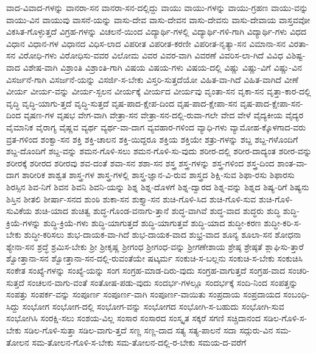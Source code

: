 {ವಾದ-ವಿವಾದ-ಗಳನ್ನು
ವಾನರಾ-ಸನ
ವಾನರಾ-ಸನ-ದಲ್ಲಿದ್ದು
ವಾಯು
ವಾಯು-ಗಳನ್ನು
ವಾಯು-ಗ್ರಹಣ
ವಾಯು-ವನ್ನು
ವಾಯು-ವಿನ
ವಾಯುವು
ವಾಸನೆ-ಯನ್ನು
ವಾಸು-ದೇವ
ವಾಸು-ದೇವನ
ವಾಸು-ದೇವನು
ವಾಸು-ದೇವಾಯ
ವಾಸ್ತವವೋ
ವಿಕಸಿತ-ಗೊಳ್ಳುತ್ತದೆ
ವಿಗ್ರಹ-ಗಳನ್ನು
ವಿಚಲನೆ-ಯಿಂದ
ವಿದ್ಯಾರ್ಥಿ-ಗಳಲ್ಲಿ
ವಿದ್ಯಾರ್ಥಿ-ಗಳಿ-ಗಾಗಿ
ವಿದ್ಯಾರ್ಥಿ-ಗಳು
ವಿಧದ
ವಿಧಾನ
ವಿಧಾನ-ಗಳ
ವಿಧಾನದ
ವಿಧಿಸ-ಲಾದ
ವಿಪರೀತ
ವಿಪರೀತ-ಕರಣೀ
ವಿಪರೀತ-ನೃತ್ಯಾ-ಸನ
ವಿಮಾನಾ-ಸನ
ವಿರತಾ-ಸನ
ವಿರೋಧಿ-ಗಳು
ವಿರೋಧಿಸು-ವವರ
ವಿಲೋಮ
ವಿವರ
ವಿವರ-ವಾಗಿ
ವಿವರಣೆ
ವಿವರಿಸ-ಲಾ-ಗಿದೆ
ವಿವಿಧ
ವಿಶಿಷ್ಟ-ವಾದ
ವಿಶೇಷ-ವಾಗಿ
ವಿಶ್ರಾಂತಿ
ವಿಶ್ರಾಂತಿ-ಗಾಗಿ
ವಿಷಯ
ವಿಷಯ-ಗಳು
ವಿಷಯ-ದಲ್ಲಿ
ವಿಷ್ಣು
ವಿಷ್ಣು-ವಿಗೆ
ವಿಷ್ಣು-ವಿನ
ವಿಸರ್ಜನೆ-ಗಾಗಿ
ವಿಸರ್ಜನೆ-ಯನ್ನು
ವಿಸರ್ಜಿ-ಸ-ಬೇಕು
ವಿಸ್ತರಿ-ಸುತ್ತದೆಯೋ
ವಿಹಿತ-ವಾ-ಗಿದೆ
ವಿಹಿತ-ವಾಗಿದೆ
ವೀಣೆ
ವೀರ್ಯ
ವೀರ್ಯ-ವನ್ನು
ವೀರ್ಯ-ಸ್ಖಲನ
ವೀರ್ಯಕ್ಕೆ
ವೀರ್ಯದ
ವೀರ್ಯವು
ವೃಂತಾ-ಸನ
ವೃಕಾ-ಸನ
ವೃತ್ತಾ-ಕಾರ-ದಲ್ಲಿ
ವೃದ್ಧಿ
ವೃದ್ಧಿ-ಯಾಗು-ತ್ತದೆ
ವೃದ್ಧಿ-ಸುತ್ತದೆ
ವೃಷ-ಪಾದ-ಕ್ಷೇಪ-ದಿಂದ
ವೃಷ-ಪಾದ-ಕ್ಷೇಪಾ-ಸನ
ವೃಷ-ಪಾದ-ಕ್ಷೇಪಾ-ಸನ-ದಿಂದ
ವೃಷಣ-ಗಳ
ವೃಷಭ
ವೇಗ-ವಾಗಿ
ವೇತ್ರಾ-ಸನ
ವೇತ್ರಾ-ಸನ-ದಲ್ಲಿ-ರುವಾ-ಗಲೇ
ವೇದ
ವೇಳೆ
ವೈದ್ಯಕೀಯ
ವೈದ್ಯರ
ವೈಮಾನಿಕ
ವೈರಾಗ್ಯ
ವೈಷ್ಣವ
ವ್ಯರ್ಥ
ವ್ಯರ್ಥ-ವಾ-ದಾಗ
ವ್ಯವಹಾರ-ಗಳಿಂದ
ವ್ಯಾಧಿ-ಗಳು
ವ್ಯಾಮೋಹ-ಕ್ಕೊಳಗಾದ-ವರು
ವ್ರತ-ಗಳಿಂದ
ಶಂಕ್ವಾ-ಸನ
ಶಕ್ತಿ
ಶಕ್ತಿ-ಚಾಲನ
ಶಕ್ತಿ-ಯಿದ್ದರೂ
ಶಕ್ತಿಯ
ಶಕ್ತಿಯೇ
ಶತ್ರು-ಗಳನ್ನು
ಶಬ್ದ
ಶಬ್ದ-ಗಳೊಂದಿಗೆ
ಶಬ್ದ-ದೊಂದಿಗೆ
ಶಬ್ದ-ವನ್ನು
ಶಮನ-ಗೊಳಿ-ಸಲು
ಶಮನ-ಗೊಳಿ-ಸು-ವುದು
ಶರೀರ-ದಲ್ಲಿ
ಶರೀರ-ದಾದ್ಯಂತ
ಶರೀರ-ವನ್ನು
ಶರೀರಕ್ಕೆ
ಶರೀರದ
ಶರೀರವು
ಶವ-ದಂತೆ
ಶವಾ-ಸನ
ಶಶಾ-ಸನ
ಶಸ್ತ್ರ
ಶಸ್ತ್ರ-ಗಳನ್ನು
ಶಸ್ತ್ರ-ಗಳಿಂದ
ಶಸ್ತ್ರ-ದಿಂದ
ಶಾಂತ-ವಾ-ದಾಗ
ಶಾರೀರಿಕ
ಶಾಶ್ವತ
ಶಾಸ್ತ್ರ-ಗಳ
ಶಾಸ್ತ್ರ-ಗಳಲ್ಲಿ
ಶಾಸ್ತ್ರ-ಜ್ಞಾನ-ವಿ-ರುವ
ಶಾಸ್ತ್ರದ
ಶಿಕ್ಷಿ-ಸುವ
ಶಿಫಾ-ರಸು
ಶಿಫಾರಸು
ಶಿರಸ್ಸಿನ
ಶಿವ-ನಿಗೆ
ಶಿವನ
ಶಿವನಿ
ಶಿವನಿ-ಯನ್ನು
ಶಿಶ್ನ
ಶಿಶ್ನ-ದೊಳಗೆ
ಶಿಶ್ನ-ದ್ವಾರದ
ಶಿಶ್ನ-ವನ್ನು
ಶಿಶ್ನದ
ಶಿಷ್ಯ-ರಿಗೆ
ಶಿಷ್ಯನು
ಶಿಸ್ತಿನ
ಶೀತಲಿ
ಶೀರ್ಷಾ-ಸನದ
ಶುಂಠಿ
ಶುಕಾ-ಸನ
ಶುಕ್ತ್ಯಾ-ಸನ
ಶುಚಿ-ಗೊಳಿ-ಸಿದ
ಶುಚಿ-ಗೊಳಿ-ಸುವ
ಶುಚಿ-ಗೊಳಿ-ಸುವಿಕೆಯ
ಶುಚಿ-ಯಾದ
ಶುಚಿತ್ವ
ಶುದ್ಧ-ಗೊಂಡ-ವನಾಗು-ತ್ತಾನೆ
ಶುದ್ಧ-ವಾಗಿವೆ
ಶುದ್ಧ-ವಾದ
ಶುದ್ಧರು
ಶುದ್ಧಿ
ಶುದ್ಧಿ-ಕ್ರಿಯೆ-ಗಳನ್ನು
ಶುದ್ಧಿ-ಕ್ರಿಯೆ-ಗಳು
ಶುದ್ಧಿ-ಯಾಗುತ್ತದೆ
ಶುದ್ಧಿ-ಯಾಗುತ್ತವೆ
ಶುದ್ಧಿ-ಯಾದ
ಶುದ್ಧೀ-ಕರಣ
ಶುದ್ಧೀ-ಕರಿ-ಸ-ಬೇಕು
ಶುದ್ಧೀ-ಕರಿಸಲು
ಶುಭ-ದಾಯಕ-ವಾ-ಗಿದೆ
ಶುಭ-ದಾಯಕ-ವಾದ
ಶುಭ್ರ-ವಾದ
ಶೂನ್ಯ
ಶೂಲಾ-ಸನ
ಶೋಧನಾ
ಶ್ಯೇನಾ-ಸನ
ಶ್ರದ್ಧೆ
ಶ್ರಮಿಸ-ಬೇಕು
ಶ್ರೀ
ಶ್ರೀಕೃಷ್ಣ
ಶ್ರೀಗಂಧ
ಶ್ರೀಗಂಧ-ವನ್ನು
ಶ್ರೀಗಣೇಶಾಯ
ಶ್ರೇಷ್ಠ
ಶ್ರೇಷ್ಠತೆ
ಶ್ಲಾಘಿಸು-ತ್ತಾರೆ
ಶ್ವೋತ್ತಾನಾ-ಸನ
ಶ್ವೋತ್ತಾನಾ-ಸನ-ದಲ್ಲಿ-ರುವಂತೆಯೇ
ಷಟ್ಕರ್ಮ
ಸಂಕುಚಿ-ಸ-ಬಲ್ಲನು
ಸಂಕುಚಿ-ಸ-ಬೇಕು
ಸಂಕುಚಿಸಿ
ಸಂಕೇತ
ಸಂಖ್ಯೆ-ಗಳನ್ನು
ಸಂಖ್ಯೆ-ಯನ್ನು
ಸಂಗ
ಸಂಗ್ರಹ-ಮಾಡ-ದಿರು-ವುದು
ಸಂಗ್ರಹ-ವಾಗುತ್ತದೆ
ಸಂಗ್ರಹ-ವಾದ
ಸಂಚರಿ-ಸುತ್ತದೆ
ಸಂಚಲನ-ವಾಗು-ವಂತೆ
ಸಂತೋಷ-ಪಡು-ವುದು
ಸಂದರ್ಭ-ಗಳಲ್ಲೂ
ಸಂದರ್ಭಕ್ಕೆ
ಸಂದಿ-ನಿಂದ
ಸಂಪತ್ತನ್ನು
ಸಂಪತ್ತು
ಸಂಪರ್ಕ-ವನ್ನು
ಸಂಪೂರ್ಣ
ಸಂಪೂರ್ಣ-ವಾಗಿ
ಸಂಪೂರ್ಣ-ವಾಯಿತು
ಸಂಪ್ರದಾಯ
ಸಂಪ್ರದಾಯದ
ಸಂಬಂಧಿ-ಸಿದ್ದು
ಸಂಭೋಗ
ಸಂಭೋಗ-ದಲ್ಲಿ
ಸಂಭೋಗ-ವನ್ನು
ಸಂಭೋಗದ
ಸಂಭೋಗಿ-ಸ-ಬಹುದು
ಸಂಭೋಗಿ-ಸುವ
ಸಂಭೋಗಿಸಿ
ಸಂರಕ್ಷಿ-ಸಲು
ಸಂಶಯ-ವಿಲ್ಲ
ಸಂಸಾರ
ಸಂಸಾರದ
ಸಂಸ್ಕೃತ
ಸಕ್ಕರೆ
ಸಗಣಿ
ಸಚ್ಚಿದಾನಂದ
ಸಡಿಲ-ಗೊಳಿ-ಸ-ಬೇಕು
ಸಡಿಲ-ಗೊಳಿ-ಸುತ್ತಾ
ಸಡಿಲ-ವಾಗು-ತ್ತದೆ
ಸಣ್ಣ
ಸಣ್ಣ-ದಾದ
ಸತ್ಯ
ಸತ್ಯ-ಪಾಲನೆ
ಸದಾ
ಸದ್ಗುರು-ವಿನ
ಸಮ-ತೋಲನ
ಸಮ-ತೋಲನ-ಗೊಳಿ-ಸ-ಬೇಕು
ಸಮ-ತೋಲನ-ದಲ್ಲಿ-ರ-ಬೇಕು
ಸಮಯ-ದ-ವರೆಗೆ
}
